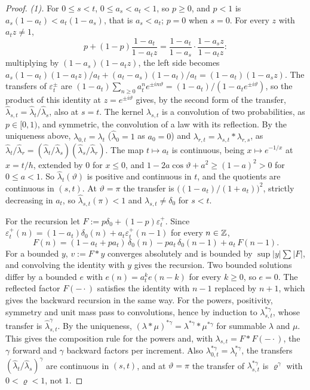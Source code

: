 \begin{proof}
\emph{(1).} For $0 \le s < t$, $0 \le a_s < a_t < 1$, so $p \ge 0$, and $p < 1$ is
$a_s(1-a_t) < a_t(1-a_s)$, that is $a_s < a_t$; $p = 0$ when $s = 0$. For every $z$ with
$a_tz \ne 1$,
\[
  p + (1-p)\frac{1 - a_t}{1 - a_tz} = \frac{1 - a_t}{1 - a_s}\cdot\frac{1 - a_sz}{1 - a_tz} :
\]
multiplying by $(1 - a_s)(1 - a_tz)$, the left side becomes
$a_s(1-a_t)(1 - a_tz)/a_t + (a_t - a_s)(1-a_t)/a_t = (1-a_t)(1 - a_sz)$. The transfers of
$\varepsilon^\pm_t$ are $(1-a_t)\sum_{n \ge 0}a_t^ne^{\pm in\vartheta} = (1-a_t)/(1 - a_te^{\pm i\vartheta})$,
so the product of this identity at $z = e^{\pm i\vartheta}$ gives, by the second form of the
transfer, $\widehat\lambda_{s,t} = \widehat\lambda_t/\widehat\lambda_s$, also at $s = t$. The kernel
$\lambda_{s,t}$ is a convolution of two probabilities, as $p \in [0,1)$, and symmetric, the
convolution of a law with its reflection. By the uniqueness above, $\lambda_{0,t} = \lambda_t$
($\widehat\lambda_0 = 1$ as $a_0 = 0$) and $\lambda_{r,t} = \lambda_{s,t} * \lambda_{r,s}$, as
$\widehat\lambda_t/\widehat\lambda_r = (\widehat\lambda_t/\widehat\lambda_s)
(\widehat\lambda_s/\widehat\lambda_r)$. The map $t \mapsto a_t$ is continuous, being
$x \mapsto e^{-1/x}$ at $x = t/h$, extended by $0$ for $x \le 0$, and
$1 - 2a\cos\vartheta + a^2 \ge (1-a)^2 > 0$ for $0 \le a < 1$. So $\widehat\lambda_t(\vartheta)$
is positive and continuous in $t$, and the quotients are continuous in $(s,t)$. At
$\vartheta = \pi$ the transfer is $\bigl((1 - a_t)/(1 + a_t)\bigr)^2$, strictly decreasing in
$a_t$, so $\widehat\lambda_{s,t}(\pi) < 1$ and $\lambda_{s,t} \ne \delta_0$ for $s < t$.

For the recursion let $F := p\delta_0 + (1-p)\varepsilon^+_t$. Since
$\varepsilon^+_t(n) = (1 - a_t)\delta_0(n) + a_t\varepsilon^+_t(n-1)$ for every $n \in \mathbb{Z}$,
\[
  F(n) = (1 - a_t + pa_t)\,\delta_0(n) - pa_t\,\delta_0(n-1) + a_t\,F(n-1) .
\]
For a bounded $y$, $v := F * y$ converges absolutely and is bounded by $\sup|y|\sum|F|$, and
convolving the identity with $y$ gives the recursion. Two bounded solutions differ by a bounded
$e$ with $e(n) = a_t^ke(n-k)$ for every $k \ge 0$, so $e = 0$. The reflected factor $F(-\cdot)$
satisfies the identity with $n - 1$ replaced by $n + 1$, which gives the backward recursion in the
same way. For the powers, positivity, symmetry and unit mass pass to convolutions, hence by
induction to $\lambda^{*\gamma}_{s,t}$, whose transfer is $\widehat\lambda_{s,t}^\gamma$. By the
uniqueness, $(\lambda * \mu)^{*\gamma} = \lambda^{*\gamma} * \mu^{*\gamma}$ for summable $\lambda$
and $\mu$. This gives the composition rule for the powers and, with $\lambda_{s,t} = F * F(-\cdot)$,
the $\gamma$ forward and $\gamma$ backward factors per increment. Also
$\lambda^{*\gamma}_{0,t} = \lambda^{*\gamma}_t$, the transfers
$(\widehat\lambda_t/\widehat\lambda_s)^\gamma$ are continuous in $(s,t)$, and at $\vartheta = \pi$
the transfer of $\lambda^{*\gamma}_{s,t}$ is $\varrho^\gamma$ with $0 < \varrho < 1$, not $1$.


\end{proof}
